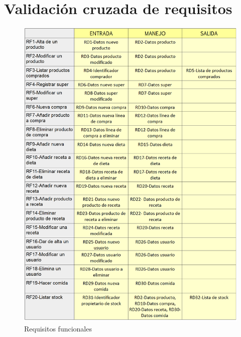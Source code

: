 \documentclass[a4paper,12pt]{report}
\begin{document}
\section{\textbf{Validación cruzada de requisitos}}
\label{sec-2-3}
\begin{figure}[!htp]
\centering
\includegraphics[width=0.9\linewidth]{./refinamientos/tablaRF1.png}
\caption{Requisitos funcionales}
\label{fig:Requisitos funcionales}
\medskip
\footnotesize
{}
\end{figure}
\end{document}
